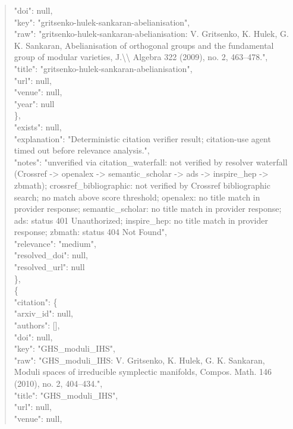 \documentclass[11pt]{article}
\begin{document}
\begin{quote}
        "doi": null,\\
        "key": "gritsenko-hulek-sankaran-abelianisation",\\
        "raw": "gritsenko-hulek-sankaran-abelianisation: V. Gritsenko, K. Hulek, G. K. Sankaran, Abelianisation of orthogonal groups and the fundamental group of modular varieties, J.\textbackslash{}\textbackslash{} Algebra 322 (2009), no. 2, 463--478.",\\
        "title": "gritsenko-hulek-sankaran-abelianisation",\\
        "url": null,\\
        "venue": null,\\
        "year": null\\
      \},\\
      "exists": null,\\
      "explanation": "Deterministic citation verifier result; citation-use agent timed out before relevance analysis.",\\
      "notes": "unverified via citation\_waterfall: not verified by resolver waterfall (Crossref -> openalex -> semantic\_scholar -> ads -> inspire\_hep -> zbmath); crossref\_bibliographic: not verified by Crossref bibliographic search; no match above score threshold; openalex: no title match in provider response; semantic\_scholar: no title match in provider response; ads: status 401 Unauthorized; inspire\_hep: no title match in provider response; zbmath: status 404 Not Found",\\
      "relevance": "medium",\\
      "resolved\_doi": null,\\
      "resolved\_url": null\\
    \},\\
    \{\\
      "citation": \{\\
        "arxiv\_id": null,\\
        "authors": [],\\
        "doi": null,\\
        "key": "GHS\_moduli\_IHS",\\
        "raw": "GHS\_moduli\_IHS: V. Gritsenko, K. Hulek, G. K. Sankaran, Moduli spaces of irreducible symplectic manifolds, Compos. Math. 146 (2010), no. 2, 404--434.",\\
        "title": "GHS\_moduli\_IHS",\\
        "url": null,\\
        "venue": null,\\

\end{quote}
\end{document}
